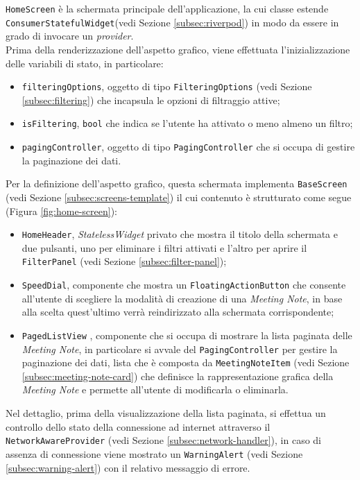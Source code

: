\lstinline{HomeScreen} è la schermata principale dell'applicazione, la cui classe estende \lstinline{ConsumerStatefulWidget}(vedi Sezione \ref{subsec:riverpod}) in modo da essere in grado di invocare un \emph{provider}. \\
Prima della renderizzazione dell'aspetto grafico, viene effettuata l'inizializzazione delle variabili di stato, in particolare:
\begin{itemize}
    \item \lstinline{filteringOptions}, oggetto di tipo \lstinline{FilteringOptions} (vedi Sezione \ref{subsec:filtering}) che incapsula le opzioni di filtraggio attive;
    \item \lstinline{isFiltering}, \lstinline{bool} che indica se l'utente ha attivato o meno almeno un filtro;
    \item \lstinline{pagingController}, oggetto di tipo \lstinline{PagingController} \cite{site:infinite-scroll-pagination} che si occupa di gestire la paginazione dei dati.
\end{itemize}
Per la definizione dell'aspetto grafico, questa schermata implementa \lstinline{BaseScreen} (vedi Sezione \ref{subsec:screens-template}) il cui contenuto è strutturato come segue (Figura \ref{fig:home-screen}):
\begin{itemize}
    \item \lstinline{HomeHeader}, \emph{StatelessWidget} privato che mostra il titolo della schermata e due pulsanti, uno per eliminare i filtri attivati e l'altro per aprire il \lstinline{FilterPanel} (vedi Sezione \ref{subsec:filter-panel});
    \item \lstinline{SpeedDial}, componente che mostra un \lstinline{FloatingActionButton} \cite{site:fab} che consente all'utente di scegliere la modalità di creazione di una \emph{Meeting Note}, in base alla scelta quest'ultimo verrà reindirizzato alla schermata corrispondente;
    \item \lstinline{PagedListView} \cite{site:infinite-scroll-pagination}, componente che si occupa di mostrare la lista paginata delle \emph{Meeting Note}, in particolare si avvale del \lstinline{PagingController} per gestire la paginazione dei dati, lista che è composta da \lstinline{MeetingNoteItem} (vedi Sezione \ref{subsec:meeting-note-card}) che definisce la rappresentazione grafica della \emph{Meeting Note} e permette all'utente di modificarla o eliminarla.
\end{itemize}
Nel dettaglio, prima della visualizzazione della lista paginata, si effettua un controllo dello stato della connessione ad internet attraverso il \lstinline{NetworkAwareProvider} (vedi Sezione \ref{subsec:network-handler}), in caso di assenza di connessione viene mostrato un \lstinline{WarningAlert} (vedi Sezione \ref{subsec:warning-alert}) con il relativo messaggio di errore. \\
